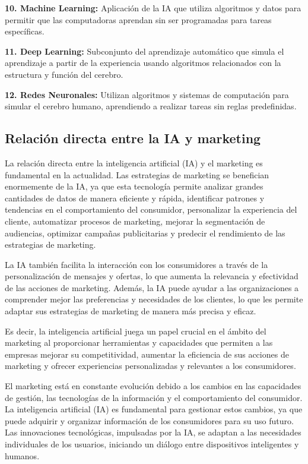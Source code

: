 \documentclass[a4paper, 12pt, twocolumn]{article}
\begin{document}
\textbf{10. Machine Learning:} Aplicación de la IA que utiliza algoritmos y datos para permitir que las computadoras aprendan sin ser programadas para tareas específicas.

\textbf{11. Deep Learning:} Subconjunto del aprendizaje automático que simula el aprendizaje a partir de la experiencia usando algoritmos relacionados con la estructura y función del cerebro.

\textbf{12. Redes Neuronales:} Utilizan algoritmos y sistemas de computación para simular el cerebro humano, aprendiendo a realizar tareas sin reglas predefinidas.


\subsection{ Relación directa entre la IA y marketing}

La relación directa entre la inteligencia artificial (IA) y el marketing es fundamental en la actualidad. Las estrategias de marketing se benefician enormemente de la IA, ya que esta tecnología permite analizar grandes cantidades de datos de manera eficiente y rápida, identificar patrones y tendencias en el comportamiento del consumidor, personalizar la experiencia del cliente, automatizar procesos de marketing, mejorar la segmentación de audiencias, optimizar campañas publicitarias y predecir el rendimiento de las estrategias de marketing.

La IA también facilita la interacción con los consumidores a través de la personalización de mensajes y ofertas, lo que aumenta la relevancia y efectividad de las acciones de marketing. Además, la IA puede ayudar a las organizaciones a comprender mejor las preferencias y necesidades de los clientes, lo que les permite adaptar sus estrategias de marketing de manera más precisa y eficaz.

Es decir, la inteligencia artificial juega un papel crucial en el ámbito del marketing al proporcionar herramientas y capacidades que permiten a las empresas mejorar su competitividad, aumentar la eficiencia de sus acciones de marketing y ofrecer experiencias personalizadas y relevantes a los consumidores.

El marketing está en constante evolución debido a los cambios en las capacidades de gestión, las tecnologías de la información y el comportamiento del consumidor. La inteligencia artificial (IA) es fundamental para gestionar estos cambios, ya que puede adquirir y organizar información de los consumidores para su uso futuro. Las innovaciones tecnológicas, impulsadas por la IA, se adaptan a las necesidades individuales de los usuarios, iniciando un diálogo entre dispositivos inteligentes y humanos.
\end{document}
